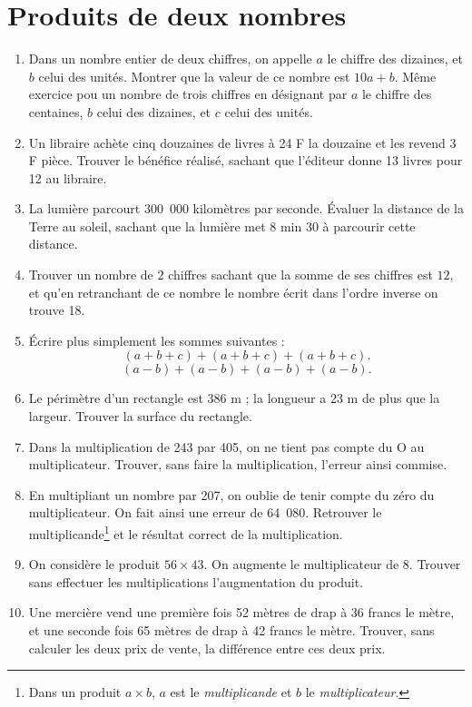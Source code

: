 
 \chapter{Produits de deux nombres}
 \begin{enumerate}
 \item Dans un nombre entier de deux chiffres, on appelle $a$ le chiffre des dizaines, et $b$ celui des unités. Montrer que la valeur de ce nombre est $10a+b$.
 Même exercice pou un nombre de trois chiffres en désignant par $a$ le chiffre des centaines, $b$ celui des dizaines, et $c$ celui des unités.
 \item Un libraire achète cinq douzaines de livres à 
 24 F la douzaine et les revend 3 F pièce. Trouver le 
 bénéfice réalisé, sachant que l'éditeur donne 13 livres pour 12 au libraire. 
 \item La lumière parcourt 300~000 kilomètres par
 seconde. Évaluer la distance de la Terre au soleil,
 sachant que la lumière met $8$ min $30$ à parcourir
 cette distance.
 \item Trouver un nombre de $2$ chiffres sachant que la somme de ses chiffres est $12$, et qu'en 
 retranchant de ce nombre le nombre écrit dans l'ordre
 inverse on trouve 18. 
 \item Écrire plus simplement les sommes suivantes :
 \[ (a + b + c) + (a + b + c) + (a + b + c).\]
 \[(a - b) + (a - b) + (a - b) + (a - b).\]
 \item Le périmètre d'un rectangle est 386 m ; 
 la longueur a 23 m de plus que la largeur.
 Trouver la surface du rectangle.
 \item Dans la multiplication de 243 par 405, on ne tient pas compte du O au multiplicateur. Trouver, sans faire la multiplication, l'erreur ainsi commise. 
 \item En multipliant un nombre par 207, on oublie de 
 tenir compte du zéro du multiplicateur. On fait ainsi
 une erreur de 64~080. Retrouver le multiplicande\footnote{Dans un produit $a\times b$, $a$ est le \emph{multiplicande} et $b$ le \emph{multiplicateur}.} et le résultat correct de la multiplication.
 \item On considère le produit $56 \times 43$. On augmente le multiplicateur de $8$. Trouver sans effectuer les multiplications l'augmentation du produit. 
 \item Une mercière vend une première fois 52 mètres de drap à 36 francs le mètre, et une seconde fois 65 mètres de drap à 42 francs le mètre. Trouver, sans calculer les deux prix de vente, la différence entre ces deux prix. 

\end{enumerate}
